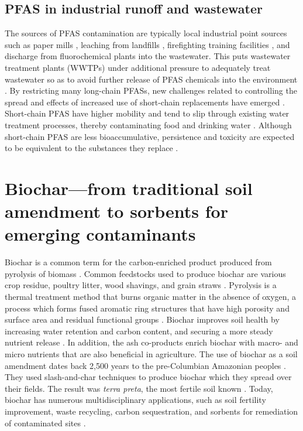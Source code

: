 \subsection{PFAS in industrial runoff and wastewater}
The sources of PFAS contamination are typically local industrial point sources such as paper mills \citep{lee2020legacy,langberg2021paper}, leaching from landfills \citep{masoner2020landfill}, firefighting training facilities \citep{filipovic2015historical}, and discharge from fluorochemical plants \citep{gebbink2017presence} into the wastewater. This puts wastewater treatment plants (WWTPs) under additional pressure  to adequately treat wastewater so as to avoid further release of PFAS chemicals into the environment  \citep{Morin2017flameWaste}. By restricting many long-chain PFASs, new challenges related to controlling the spread and effects of increased use of short-chain replacements have emerged \citep{knutsen2019leachate}. Short-chain PFAS have higher mobility and tend to slip through existing water treatment processes, thereby contaminating food and drinking water \citep{hale2020persistent,brendel2018short}. Although short-chain PFAS are less bioaccumulative, persistence and toxicity are expected to be equivalent to the substances they replace \citep{EC2020PFAS}. 


\section{Biochar---from traditional soil amendment to sorbents for emerging contaminants}
Biochar is a common term for the carbon-enriched product produced from pyrolysis of biomass \citep{LehmannAndJoseph2015}. Common feedstocks used to produce biochar are various crop residue, poultry litter, wood shavings, and grain straws \citep{Ahmad2014}. Pyrolysis is a thermal treatment method that burns organic matter in the absence of oxygen, a process which forms fused aromatic ring structures that have high porosity and surface area and residual functional groups \citep{LehmannAndJoseph2015}. Biochar improves soil health by increasing water retention and carbon content, and securing a more steady nutrient release \citep{das2020application}. In addition, the ash co-products enrich biochar with macro- and micro nutrients that are also beneficial in agriculture. The use of biochar as a soil amendment dates back 2,500 years to the pre-Columbian Amazonian peoples \citep{Tindall2017}. They used slash-and-char techniques to produce biochar which they spread over their fields. The result was \textit{terra preta}, the most fertile soil known \citep{Ahmad2014}. Today, biochar has numerous multidisciplinary applications, such as soil fertility improvement, waste recycling, carbon sequestration, and sorbents for remediation of contaminated sites \citep{beesley2011review}.

